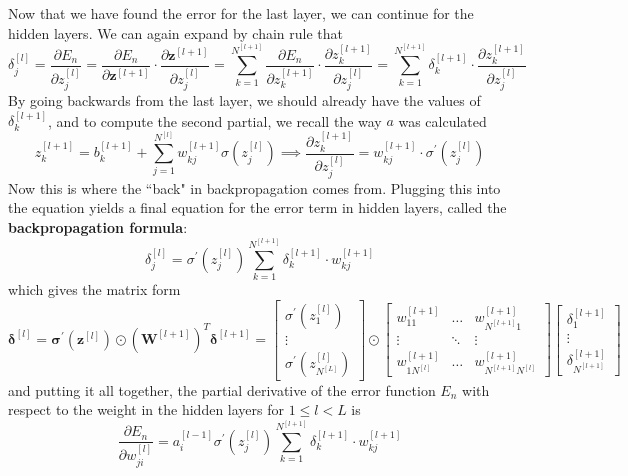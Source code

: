 \begin{algo}[Backpropagation]
    Now that we have found the error for the last layer, we can continue for the hidden layers. We can again expand by chain rule that 
    \begin{equation} 
      \delta_j^{[l]} = \frac{\partial E_n}{\partial z_j^{[l]}} = \frac{\partial E_n}{\partial \mathbf{z}^{[l+1]}} \cdot \frac{\partial \mathbf{z}^{[l+1]}}{\partial z_j^{[l]}} = \sum_{k=1}^{N^{[l+1]}} \frac{\partial E_n}{\partial z_k^{[l+1]}} \cdot \frac{\partial z_k^{[l+1]}}{\partial z_j^{[l]}} = \sum_{k=1}^{N^{[l+1]}} \delta_k^{[l+1]} \cdot \frac{\partial z_k^{[l+1]}}{\partial z_j^{[l]}}
    \end{equation} 
    By going backwards from the last layer, we should already have the values of $\delta_k^{[l+1]}$, and to compute the second partial, we recall the way $a$ was calculated 
    \begin{equation}
      z_k^{[l+1]} = b_k^{[l+1]} + \sum_{j=1}^{N^{[l]}} w_{kj}^{[l+1]} \sigma(z_j^{[l]}) \implies \frac{\partial z_k^{[l+1]}}{\partial z_j^{[l]}} = w_{kj}^{[l+1]} \cdot \sigma^\prime(z_j^{[l]})
    \end{equation}
    Now this is where the ``back" in backpropagation comes from. Plugging this into the equation yields a final equation for the error term in hidden layers, called the \textbf{backpropagation formula}: 
    \begin{equation}
      \delta_j^{[l]} = \sigma^\prime(z_j^{[l]}) \sum_{k=1}^{N^{[l+1]}} \delta_k^{[l+1]} \cdot w_{kj}^{[l+1]}
    \end{equation}
    which gives the matrix form 
    \begin{equation}
      \boldsymbol{\delta}^{[l]} = \boldsymbol{\sigma}^\prime (\mathbf{z}^{[l]}) \odot (\mathbf{W}^{[l+1]})^T \boldsymbol{\delta}^{[l+1]} = \begin{bmatrix} \sigma^\prime (z_1^{[l]}) \\ \vdots \\ \sigma^\prime (z_{N^{[L]}}^{[l]})\end{bmatrix} \odot \begin{bmatrix} w_{11}^{[l+1]} & \ldots & w^{[l+1]}_{N^{[l+1]} 1} \\ \vdots & \ddots & \vdots \\ w^{[l+1]}_{1 N^{[l]}} & \ldots & w^{[l+1]}_{N^{[l+1]} N^{[l]}} \end{bmatrix} \begin{bmatrix} \delta_1^{[l+1]} \\ \vdots \\ \delta_{N^{[l+1]}}^{[l+1]} \end{bmatrix} 
    \end{equation}
    and putting it all together, the partial derivative of the error function $E_n$ with respect to the weight in the hidden layers for $1 \leq l < L$ is 
    \begin{equation}
      \frac{\partial E_n}{\partial w_{ji}^{[l]}} = a_i^{[l-1]} \sigma^\prime(z_j^{[l]}) \sum_{k=1}^{N^{[l+1]}} \delta_k^{[l+1]} \cdot w_{kj}^{[l+1]} 
    \end{equation}
  \end{algo}

